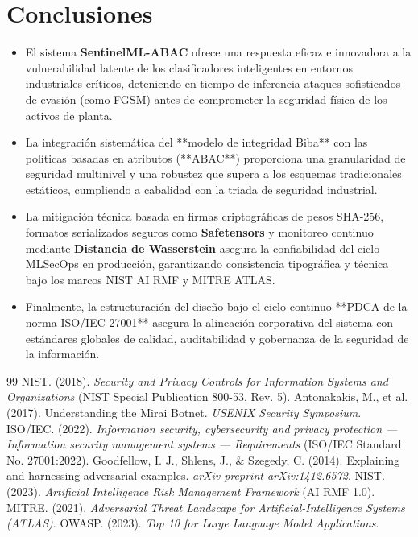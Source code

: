 \documentclass[12pt,letterpaper]{article}
\begin{document}
\section{Conclusiones}

\begin{itemize}
    \item   El sistema \textbf{SentinelML-ABAC} ofrece una respuesta eficaz e innovadora a la vulnerabilidad latente de los clasificadores inteligentes en entornos industriales críticos, deteniendo en tiempo de inferencia ataques sofisticados de evasión (como FGSM) antes de comprometer la seguridad física de los activos de planta.
    \item   La integración sistemática del **modelo de integridad Biba** con las políticas basadas en atributos (**ABAC**) proporciona una granularidad de seguridad multinivel y una robustez que supera a los esquemas tradicionales estáticos, cumpliendo a cabalidad con la triada de seguridad industrial.
    \item   La mitigación técnica basada en firmas criptográficas de pesos SHA-256, formatos serializados seguros como \textbf{Safetensors} y monitoreo continuo mediante \textbf{Distancia de Wasserstein} asegura la confiabilidad del ciclo MLSecOps en producción, garantizando consistencia tipográfica y técnica bajo los marcos NIST AI RMF y MITRE ATLAS.
    \item   Finalmente, la estructuración del diseño bajo el ciclo continuo **PDCA de la norma ISO/IEC 27001** asegura la alineación corporativa del sistema con estándares globales de calidad, auditabilidad y gobernanza de la seguridad de la información.
\end{itemize}

\begin{thebibliography}{99}
 NIST. (2018). \textit{Security and Privacy Controls for Information Systems and Organizations} (NIST Special Publication 800-53, Rev. 5).
 Antonakakis, M., et al. (2017). Understanding the Mirai Botnet. \textit{USENIX Security Symposium}.
 ISO/IEC. (2022). \textit{Information security, cybersecurity and privacy protection — Information security management systems — Requirements} (ISO/IEC Standard No. 27001:2022).
 Goodfellow, I. J., Shlens, J., \& Szegedy, C. (2014). Explaining and harnessing adversarial examples. \textit{arXiv preprint arXiv:1412.6572}.
 NIST. (2023). \textit{Artificial Intelligence Risk Management Framework} (AI RMF 1.0).
 MITRE. (2021). \textit{Adversarial Threat Landscape for Artificial-Intelligence Systems (ATLAS)}.
 OWASP. (2023). \textit{Top 10 for Large Language Model Applications}.
\end{thebibliography}
\end{document}
